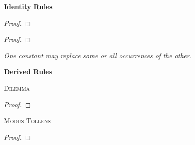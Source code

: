 






































\twocolumn %


{\large \bf Identity Rules}

\begin{proof}
	 
\end{proof}

\begin{proof}
	 
	 
\end{proof}

\begin{footnotesize}\emph{One constant may replace some or all occurrences of the other.}
\end{footnotesize}






{\large \bf Derived Rules}

\textsc{Dilemma}

\begin{proof}
	 
\end{proof}

\textsc{Modus Tollens}

\begin{proof}
	 
\end{proof}

